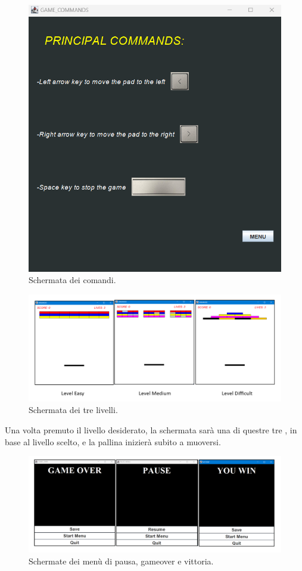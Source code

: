 \documentclass[a4paper,12pt]{report}
\begin{document}
\begin{figure}[H]
    \centering{}
    \includegraphics[scale=0.5]{images/GameCommandsGuidaUtente.png}
    \caption{Schermata dei comandi.}
    \label{images:Comandi}
\end{figure}
\begin{figure}[H]
    \centering{}
    \includegraphics[scale=0.5]{images/Leves.png}
    \caption{Schermata dei tre livelli.}
    \label{images:Levels}
\end{figure}
Una volta premuto il livello desiderato, la schermata sarà una di questre tre , in base al livello scelto,
e la pallina inizierà subito a muoversi.
\begin{figure}[H]
    \centering{}
    \includegraphics[scale=0.5]{images/Schermate.png}
    \caption{Schermate dei menù di pausa, gameover e vittoria.}
    \label{images:Views}
\end{figure}
\end{document}

